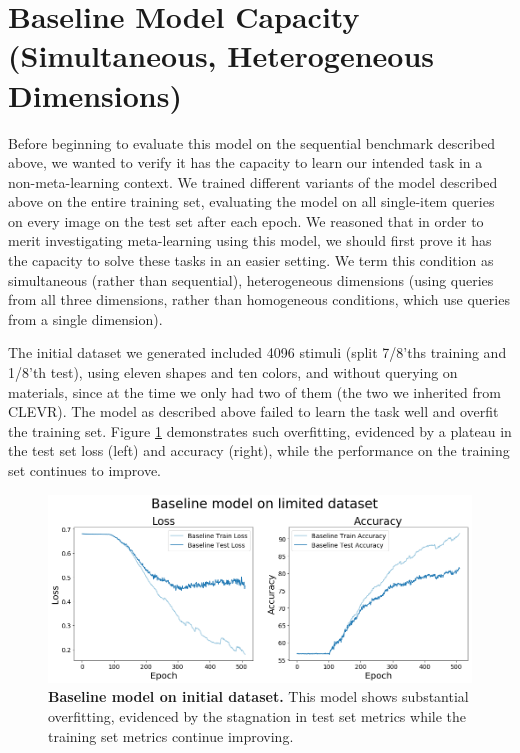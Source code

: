 \FloatBarrier
\section{Baseline Model Capacity (Simultaneous, Heterogeneous Dimensions)}
Before beginning to evaluate this model on the sequential benchmark described above, we wanted to verify it has the capacity to learn our intended task in a non-meta-learning context. We trained different variants of the model described above on the entire training set, evaluating the model on all single-item queries on every image on the test set after each epoch. We reasoned that in order to merit investigating meta-learning using this model, we should first prove it has the capacity to solve these tasks in an easier setting. We term this condition as simultaneous (rather than sequential), heterogeneous dimensions (using queries from all three dimensions, rather than homogeneous conditions, which use queries from a single dimension).

The initial dataset we generated included 4096 stimuli (split 7/8'ths training and 1/8'th test), using eleven shapes and ten colors, and without querying on materials, since at the time we only had two of them (the two we inherited from CLEVR). The model as described above failed to learn the task well and overfit the training set. Figure \ref{fig:results-baseline-initial-dataset} demonstrates such overfitting, evidenced by a plateau in the test set loss (left) and accuracy (right), while the performance on the training set continues to improve.

\begin{figure}[!htb]
\centering
\includegraphics[width=\linewidth]{ch-results/figures/baseline/initial_dataset.png}
\caption{{\bf Baseline model on initial dataset.} This model shows substantial overfitting, evidenced by the stagnation in test set metrics while the training set metrics continue improving.}
\label{fig:results-baseline-initial-dataset}
\end{figure}

